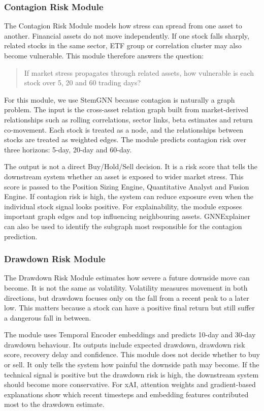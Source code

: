 \documentclass[conference]{IEEEtran}
\begin{document}
\subsubsection{Contagion Risk Module}
The Contagion Risk Module models how stress can spread from one asset to another. Financial assets do not move independently. If one stock falls sharply, related stocks in the same sector, ETF group or correlation cluster may also become vulnerable. This module therefore answers the question:
\begin{quote}
If market stress propagates through related assets, how vulnerable is each stock over 5, 20 and 60 trading days?
\end{quote}

For this module, we use StemGNN\cite{StemGNN} because contagion is naturally a graph problem. The input is the cross-asset relation graph built from market-derived relationships such as rolling correlations, sector links, beta estimates and return co-movement. Each stock is treated as a node, and the relationships between stocks are treated as weighted edges. The module predicts contagion risk over three horizons: 5-day, 20-day and 60-day.

The output is not a direct Buy/Hold/Sell decision. It is a risk score that tells the downstream system whether an asset is exposed to wider market stress. This score is passed to the Position Sizing Engine, Quantitative Analyst and Fusion Engine. If contagion risk is high, the system can reduce exposure even when the individual stock signal looks positive. For explainability, the module exposes important graph edges and top influencing neighbouring assets. GNNExplainer\cite{5thPaper} can also be used to identify the subgraph most responsible for the contagion prediction.
\subsubsection{Drawdown Risk Module}
The Drawdown Risk Module estimates how severe a future downside move can become. It is not the same as volatility. Volatility measures movement in both directions, but drawdown focuses only on the fall from a recent peak to a later low. This matters because a stock can have a positive final return but still suffer a dangerous fall in between.

The module uses Temporal Encoder embeddings and predicts 10-day and 30-day drawdown behaviour. Its outputs include expected drawdown, drawdown risk score, recovery delay and confidence. This module does not decide whether to buy or sell. It only tells the system how painful the downside path may become. If the technical signal is positive but the drawdown risk is high, the downstream system should become more conservative. For xAI, attention weights and gradient-based explanations show which recent timesteps and embedding features contributed most to the drawdown estimate.
\end{document}
